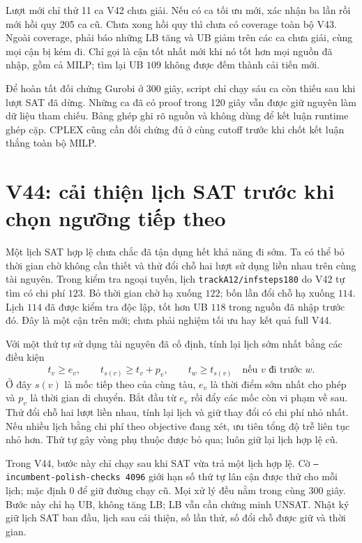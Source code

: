 \documentclass[11pt,a4paper]{article}
\newcommand{\code}[1]{\texttt{#1}}
\begin{document}
Lượt mới chỉ thử 11 ca V42 chưa giải. Nếu có ca tối ưu mới, xác nhận ba
lần rồi mới hồi quy 205 ca cũ. Chưa xong hồi quy thì chưa có coverage
toàn bộ V43. Ngoài coverage, phải báo những LB tăng và UB giảm trên các
ca chưa giải, cùng mọi cận bị kém đi. Chỉ gọi là cận tốt nhất mới khi nó
tốt hơn mọi nguồn đã nhập, gồm cả MILP; tìm lại UB $109$ không được đếm
thành cải tiến mới.

Để hoàn tất đối chứng Gurobi ở 300 giây, script chỉ chạy sáu ca còn
thiếu sau khi lượt SAT đã dừng. Những ca đã có proof trong 120 giây vẫn
được giữ nguyên làm dữ liệu tham chiếu. Bảng ghép ghi rõ nguồn và không
dùng để kết luận runtime ghép cặp. CPLEX cũng cần đối chứng đủ ở cùng
cutoff trước khi chốt kết luận thắng toàn bộ MILP.

\section{V44: cải thiện lịch SAT trước khi chọn ngưỡng tiếp theo}

Một lịch SAT hợp lệ chưa chắc đã tận dụng hết khả năng đi sớm. Ta có
thể bỏ thời gian chờ không cần thiết và thử đổi chỗ hai lượt sử dụng
liền nhau trên cùng tài nguyên. Trong kiểm tra ngoại tuyến, lịch
\code{trackA12/infsteps180} do V42 tự tìm có chi phí $123$. Bỏ thời
gian chờ hạ xuống $122$; bốn lần đổi chỗ hạ xuống $114$. Lịch $114$
đã được kiểm tra độc lập, tốt hơn UB $118$ trong nguồn đã nhập trước đó.
Đây là một cận trên mới; chưa phải nghiệm tối ưu hay kết quả full V44.

Với một thứ tự sử dụng tài nguyên đã cố định, tính lại lịch sớm nhất
bằng các điều kiện
\[
 t_v\ge e_v,\qquad t_{s(v)}\ge t_v+p_v,\qquad
 t_w\ge t_{s(v)}\quad\text{nếu }v\text{ đi trước }w.
\]
Ở đây $s(v)$ là mốc tiếp theo của cùng tàu, $e_v$ là thời điểm sớm
nhất cho phép và $p_v$ là thời gian di chuyển. Bắt đầu từ $e_v$ rồi
đẩy các mốc còn vi phạm về sau. Thử đổi chỗ hai lượt liền nhau, tính
lại lịch và giữ thay đổi có chi phí nhỏ nhất. Nếu nhiều lịch bằng chi
phí theo objective đang xét, ưu tiên tổng độ trễ liên tục nhỏ hơn.
Thứ tự gây vòng phụ thuộc được bỏ qua; luôn giữ lại lịch hợp lệ cũ.

Trong V44, bước này chỉ chạy sau khi SAT vừa trả một lịch hợp lệ. Cờ
\code{--incumbent-polish-checks 4096} giới hạn số thứ tự lân cận được
thử cho mỗi lịch; mặc định $0$ để giữ đường chạy cũ. Mọi xử lý đều
nằm trong cùng 300 giây. Bước này chỉ hạ UB, không tăng LB; LB vẫn cần
chứng minh UNSAT. Nhật ký giữ lịch SAT ban đầu, lịch sau cải thiện,
số lần thử, số đổi chỗ được giữ và thời gian.
\end{document}
